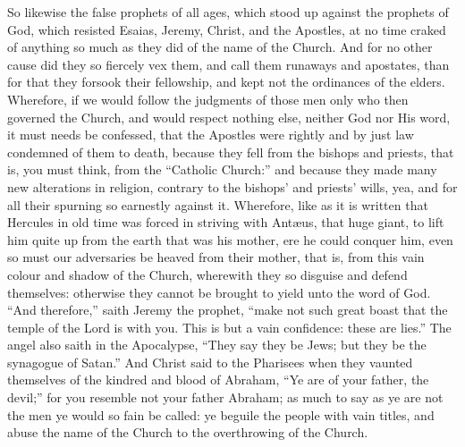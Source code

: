 So likewise the false prophets of all ages, which stood up against
the prophets of God, which resisted Esaias, Jeremy, Christ, and the
Apostles, at no time craked of anything so much as they did of the name
of the Church. And for no other cause did they so fiercely vex
them, and call them runaways and apostates, than for that they forsook
their fellowship, and kept not the ordinances of the elders. Wherefore,
if we would follow the judgments of those men only who then governed
the Church, and would respect nothing else, neither God nor His word,
it must needs be confessed, that the
Apostles were rightly and by just law condemned of them to death, because
they fell from the bishops and priests, that is, you must think, from
the “Catholic Church:” and because they made many new alterations
in religion, contrary to the bishops’ and priests’ wills,
yea, and for all their spurning so earnestly against it. Wherefore,
like as it is written that Hercules in old time was forced in striving
with Antæus, that huge giant, to lift him quite up from the earth
that was his mother, ere he could conquer him, even so must our adversaries
be heaved from their mother, that is, from this vain colour and shadow
of the Church, wherewith they so disguise and defend themselves: otherwise
they cannot be brought to yield unto the word of God. “And
therefore,” saith Jeremy the prophet, “make not such great
boast that the temple of the Lord is with you. This is but a vain
confidence: these are lies.” The angel also saith in the
Apocalypse, “They say they be Jews; but they be the synagogue
of Satan.” And Christ said to the Pharisees when they vaunted
themselves of the kindred and blood of Abraham, “Ye are of your
father, the devil;” for you resemble not your father Abraham;
as much to say as ye are not the men ye would so fain be called: ye
beguile the people with vain titles, and abuse the name
of the Church to the overthrowing of the Church.

